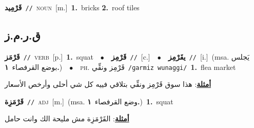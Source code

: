 \documentclass[10pt,a4paper,twoside]{article} %
\begin{document}
\begin{multicols}{2}
{\setlength\topsep{0pt}\textbf{\foreignlanguage{arabic}{قَرْمِيد}}\ {\color{gray}\texttt{//}\color{black}}\ \textsc{noun}\ [m.]\ \textbf{1.}~bricks  \textbf{2.}~roof tiles\ } \vspace{2mm}

\vspace{-3mm}
\subsection*{\color{blue}\foreignlanguage{arabic}{ق.ر.م.ز}\color{blue}{}} 

{\setlength\topsep{0pt}\textbf{\foreignlanguage{arabic}{قَرْمَز}}\ {\color{gray}\texttt{//}\color{black}}\ \textsc{verb}\ [p.]\ \textbf{1.}~squat\ \ $\bullet$\ \ \setlength\topsep{0pt}\textbf{\foreignlanguage{arabic}{قَرْمِز}}\ {\color{gray}\texttt{//}\color{black}}\ [c.]\ \ $\bullet$\ \ \setlength\topsep{0pt}\textbf{\foreignlanguage{arabic}{يقَرْمِز}}\ {\color{gray}\texttt{//}\color{black}}\ [i.]\ \color{gray}(msa. \foreignlanguage{arabic}{يَجلس بوضع القرفصاء}~\foreignlanguage{arabic}{\textbf{١.}})\color{black}\ \ $\bullet$\ \ \textsc{ph.} \color{gray} \foreignlanguage{arabic}{قَرْمِز ونقِّي}\color{black}\ {\color{gray}\texttt{/{\sffamily ɡarmiz wunaɡɡi}/}\color{black}}\ \textbf{1.}~flea market\  \begin{flushright}\color{gray}\foreignlanguage{arabic}{\textbf{\underline{\foreignlanguage{arabic}{أمثلة}}}: هذا سوق قَرْمِز ونقِّي بتلاقي فييه كل شي أحلى وأرخص الأسعار}\end{flushright}\color{black}} \vspace{2mm}

{\setlength\topsep{0pt}\textbf{\foreignlanguage{arabic}{قَرْمَزِة}}\ {\color{gray}\texttt{//}\color{black}}\ \textsc{adj}\ [m.]\ \color{gray}(msa. \foreignlanguage{arabic}{وضع القرفصاء}~\foreignlanguage{arabic}{\textbf{١.}})\color{black}\ \textbf{1.}~squat\  \begin{flushright}\color{gray}\foreignlanguage{arabic}{\textbf{\underline{\foreignlanguage{arabic}{أمثلة}}}: القَرْمَزِة مش مليحة الك وانت حامل}\end{flushright}\color{black}} \vspace{2mm}


\end{multicols}
\end{document}

